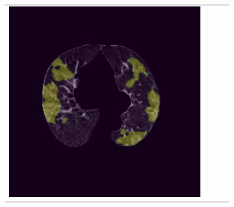 \begin{figure}
\begin{tabular}{c c c c}
    \includegraphics[scale=0.46]{images/Result2-25-capsnet.jpg}\\
    

\end{tabular}
\end{figure}
